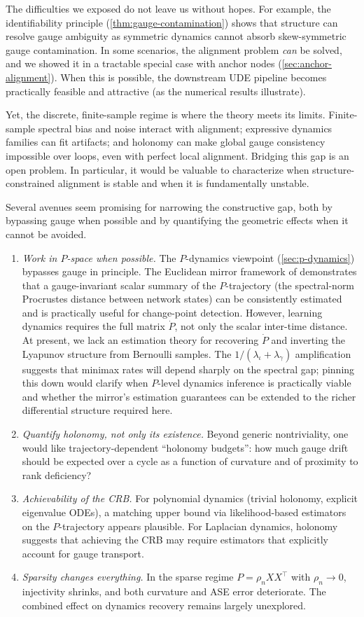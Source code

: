 \documentclass{article}
\theoremstyle{plain}
\theoremstyle{definition}
\theoremstyle{remark}
\begin{document}
The difficulties we exposed do not leave us without hopes.
For example, the identifiability principle (\cref{thm:gauge-contamination}) shows that structure can resolve gauge ambiguity as symmetric dynamics cannot absorb skew-symmetric gauge contamination.
In some scenarios, the alignment problem \emph{can} be solved, and we showed it in a tractable special case with anchor nodes (\cref{sec:anchor-alignment}). When this is possible, the downstream UDE pipeline becomes practically feasible and attractive (as the numerical results illustrate).

Yet, the discrete, finite-sample regime is where the theory meets its limits.
Finite-sample spectral bias and noise interact with alignment; expressive dynamics families can fit artifacts; and holonomy can make global gauge consistency impossible over loops, even with perfect local alignment.
Bridging this gap is an open problem. In particular, it would be valuable to characterize when structure-constrained alignment is stable and when it is fundamentally unstable.

Several avenues seem promising for narrowing the constructive gap, both by bypassing gauge when possible and by quantifying the geometric effects when it cannot be avoided.
\begin{enumerate}
\item \emph{Work in $P$-space when possible.} The $P$-dynamics viewpoint (\cref{sec:p-dynamics}) bypasses gauge in principle. The Euclidean mirror framework of \citet{athreya2024euclidean} demonstrates that a gauge-invariant scalar summary of the $P$-trajectory (the spectral-norm Procrustes distance between network states) can be consistently estimated and is practically useful for change-point detection. However, learning dynamics requires the full matrix $\dot{P}$, not only the scalar inter-time distance. At present, we lack an estimation theory for recovering $\dot{P}$ and inverting the Lyapunov structure from Bernoulli samples. The $1/(\lambda_\iota + \lambda_\gamma)$ amplification suggests that minimax rates will depend sharply on the spectral gap; pinning this down would clarify when $P$-level dynamics inference is practically viable and whether the mirror's estimation guarantees can be extended to the richer differential structure required here.
\item \emph{Quantify holonomy, not only its existence.} Beyond generic nontriviality, one would like trajectory-dependent ``holonomy budgets'': how much gauge drift should be expected over a cycle as a function of curvature and of proximity to rank deficiency?
\item \emph{Achievability of the CRB.} For polynomial dynamics (trivial holonomy, explicit eigenvalue ODEs), a matching upper bound via likelihood-based estimators on the $P$-trajectory appears plausible. For Laplacian dynamics, holonomy suggests that achieving the CRB may require estimators that explicitly account for gauge transport.
\item \emph{Sparsity changes everything.} In the sparse regime $P = \rho_n XX^\top$ with $\rho_n \to 0$, injectivity shrinks, and both curvature and ASE error deteriorate. The combined effect on dynamics recovery remains largely unexplored.
\end{enumerate}
\end{document}
